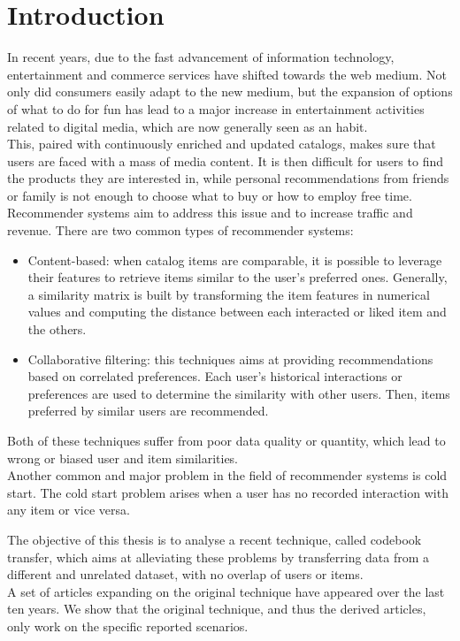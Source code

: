 \chapter{Introduction}

In recent years, due to the fast advancement of information technology, entertainment and commerce services have shifted towards the web medium.
Not only did consumers easily adapt to the new medium, but the expansion of options of what to do for fun has lead to a major increase in entertainment activities related to digital media, which are now generally seen as an habit.\\
This, paired with continuously enriched and updated catalogs, makes sure that users are faced with a mass of media content. It is then difficult for users to find the products they are interested in, while personal recommendations from friends or family is not enough to choose what to buy or how to employ free time. Recommender systems aim to address this issue and to increase traffic and revenue. There are two common types of recommender systems:
\begin{itemize}
\item Content-based: when catalog items are comparable, it is possible to leverage their features to retrieve items similar to the user's preferred ones. Generally, a similarity matrix is built by transforming the item features in numerical values and computing the distance between each interacted or liked item and the others.
\item Collaborative filtering: this techniques aims at providing recommendations based on correlated preferences. Each user's historical interactions or preferences are used to determine the similarity with other users. Then, items preferred by similar users are recommended.
\end{itemize}
Both of these techniques suffer from poor data quality or quantity, which lead to wrong or biased user and item similarities.\\
Another common and major problem in the field of recommender systems is cold start.
The cold start problem arises when a user has no recorded interaction with any item or vice versa.\par
The objective of this thesis is to analyse a recent technique, called codebook transfer, which aims at alleviating these problems by transferring data from a different and unrelated dataset, with no overlap of users or items.\\
A set of articles expanding on the original technique have appeared over the last ten years.
We show that the original technique, and thus the derived articles, only work on the specific reported scenarios.


